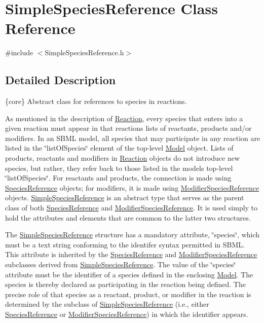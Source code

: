 \hypertarget{class_simple_species_reference}{}\section{Simple\+Species\+Reference Class Reference}
\label{class_simple_species_reference}


{\ttfamily \#include $<$Simple\+Species\+Reference.\+h$>$}



\subsection{Detailed Description}
\{core\} Abstract class for references to species in reactions.

As mentioned in the description of \hyperlink{class_reaction}{Reaction}, every species that enters into a given reaction must appear in that reaction\textquotesingle{}s lists of reactants, products and/or modifiers. In an S\+B\+ML model, all species that may participate in any reaction are listed in the \char`\"{}list\+Of\+Species\char`\"{} element of the top-\/level \hyperlink{class_model}{Model} object. Lists of products, reactants and modifiers in \hyperlink{class_reaction}{Reaction} objects do not introduce new species, but rather, they refer back to those listed in the model\textquotesingle{}s top-\/level \char`\"{}list\+Of\+Species\char`\"{}. For reactants and products, the connection is made using \hyperlink{class_species_reference}{Species\+Reference} objects; for modifiers, it is made using \hyperlink{class_modifier_species_reference}{Modifier\+Species\+Reference} objects. \hyperlink{class_simple_species_reference}{Simple\+Species\+Reference} is an abstract type that serves as the parent class of both \hyperlink{class_species_reference}{Species\+Reference} and \hyperlink{class_modifier_species_reference}{Modifier\+Species\+Reference}. It is used simply to hold the attributes and elements that are common to the latter two structures.

The \hyperlink{class_simple_species_reference}{Simple\+Species\+Reference} structure has a mandatory attribute, \char`\"{}species\char`\"{}, which must be a text string conforming to the identifer syntax permitted in S\+B\+ML. This attribute is inherited by the \hyperlink{class_species_reference}{Species\+Reference} and \hyperlink{class_modifier_species_reference}{Modifier\+Species\+Reference} subclasses derived from \hyperlink{class_simple_species_reference}{Simple\+Species\+Reference}. The value of the \char`\"{}species\char`\"{} attribute must be the identifier of a species defined in the enclosing \hyperlink{class_model}{Model}. The species is thereby declared as participating in the reaction being defined. The precise role of that species as a reactant, product, or modifier in the reaction is determined by the subclass of \hyperlink{class_simple_species_reference}{Simple\+Species\+Reference} (i.\+e., either \hyperlink{class_species_reference}{Species\+Reference} or \hyperlink{class_modifier_species_reference}{Modifier\+Species\+Reference}) in which the identifier appears.

